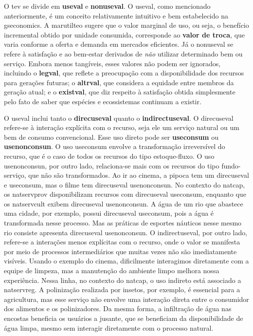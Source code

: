 \documentclass[./main.tex]{subfiles}
\begin{document}
\par O \gls{tev} se divide em \textbf{\gls{useval}} e \textbf{\gls{nonuseval}}. O \gls{useval}, como mencionado anteriormente, é um conceito relativamente intuitivo e bem estabelecido na \gls{gseconomics}. A \gls{marutilteo} sugere que o valor marginal de uso, ou seja, o benefício incremental obtido por unidade consumida, corresponde ao \textbf{valor de troca}, que varia conforme a oferta e demanda em mercados eficientes. Já o \gls{nonuseval} se refere à satisfação e ao bem-estar derivados de \textit{não} utilizar determinado bem ou serviço. Embora menos tangíveis, esses valores não podem ser ignorados, incluindo o \textbf{\gls{legval}}, que reflete a preocupação com a disponibilidade dos recursos para gerações futuras; o \textbf{\gls{altrval}}, que considera a equidade entre membros da geração atual; e o \textbf{\gls{existval}}, que diz respeito à satisfação obtida simplesmente pelo fato de saber que espécies e ecossistemas continuam a existir.

\par O \gls{useval} inclui tanto o \textbf{\gls{direcuseval}} quanto o \textbf{\gls{indirectuseval}}. O \gls{direcuseval} refere-se à interação explícita com o recurso, seja ele um serviço natural ou um bem de consumo convencional. Esse uso direto pode ser \textbf{\gls{useconsum}} ou \textbf{\gls{usenonconsun}}. O uso \gls{useconsum} envolve a transformação irreversível do recurso, que é o caso de todos os recursos do tipo estoque-fluxo. O uso \gls{usenonconsun}, por outro lado, relaciona-se mais com os recursos do tipo fundo-serviço, que não são transformados. Ao ir ao cinema, a pipoca tem um \gls{direcuseval} e \gls{useconsum}, mas o filme tem \gls{direcuseval} \gls{usenonconsun}. No contexto do \gls{natcap}, os \gls{natservprov} disponibilizam recursos com \gls{direcuseval} \gls{useconsum}, enquanto que os \gls{natservcult} exibem \gls{direcuseval} \gls{usenonconsun}. A água de um rio que abastece uma cidade, por exemplo, possui \gls{direcuseval} \gls{useconsum}, pois a água é transformada nesse processo. Mas as práticas de esportes náuticos nesse mesmo rio consiste apresenta \gls{direcuseval} \gls{usenonconsun}. O \gls{indirectuseval}, por outro lado, refere-se a interações menos explícitas com o recurso, onde o valor se manifesta por meio de processos intermediários que muitas vezes não são imediatamente visíveis. Usando o exemplo do cinema, dificilmente interagimos diretamente com a equipe de limpeza, mas a manutenção do ambiente limpo melhora nossa experiência. Nessa linha, no contexto do \gls{natcap}, o uso indireto está associado a \gls{natservreg}. A polinização realizada por insetos, por exemplo, é essencial para a agricultura, mas esse serviço não envolve uma interação direta entre o consumidor dos alimentos e os polinizadores. Da mesma forma, a infiltração de água nas encostas beneficia os usuários a jusante, que se beneficiam da disponibilidade de água limpa, mesmo sem interagir diretamente com o processo natural.
\end{document}
